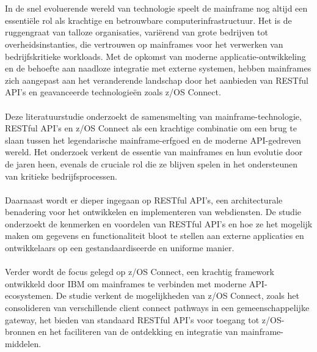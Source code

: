 \chapter{}%
\label{ch:stand-van-zaken}

In de snel evoluerende wereld van technologie speelt de mainframe nog altijd een essentiële rol als krachtige en betrouwbare computerinfrastructuur. Het is de ruggengraat van talloze organisaties, variërend van grote bedrijven tot overheidsinstanties, die vertrouwen op mainframes voor het verwerken van bedrijfskritieke workloads. Met de opkomst van moderne applicatie-ontwikkeling en de behoefte aan naadloze integratie met externe systemen, hebben mainframes zich aangepast aan het veranderende landschap door het aanbieden van RESTful API's en geavanceerde technologieën zoals z/OS Connect.
\\ \\
Deze literatuurstudie onderzoekt de samensmelting van mainframe-technologie, RESTful API's en z/OS Connect als een krachtige combinatie om een brug te slaan tussen het legendarische mainframe-erfgoed en de moderne API-gedreven wereld. Het onderzoek verkent de essentie van mainframes en hun evolutie door de jaren heen, evenals de cruciale rol die ze blijven spelen in het ondersteunen van kritieke bedrijfsprocessen.
\\ \\
Daarnaast wordt er dieper ingegaan op RESTful API's, een architecturale benadering voor het ontwikkelen en implementeren van webdiensten. De studie onderzoekt de kenmerken en voordelen van RESTful API's en hoe ze het mogelijk maken om gegevens en functionaliteit bloot te stellen aan externe applicaties en ontwikkelaars op een gestandaardiseerde en uniforme manier.
\\ \\
Verder wordt de focus gelegd op z/OS Connect, een krachtig framework ontwikkeld door IBM om mainframes te verbinden met moderne API-ecosystemen. De studie verkent de mogelijkheden van z/OS Connect, zoals het consolideren van verschillende client connect pathways in een gemeenschappelijke gateway, het bieden van standaard RESTful API's voor toegang tot z/OS-bronnen en het faciliteren van de ontdekking en integratie van mainframe-middelen.


